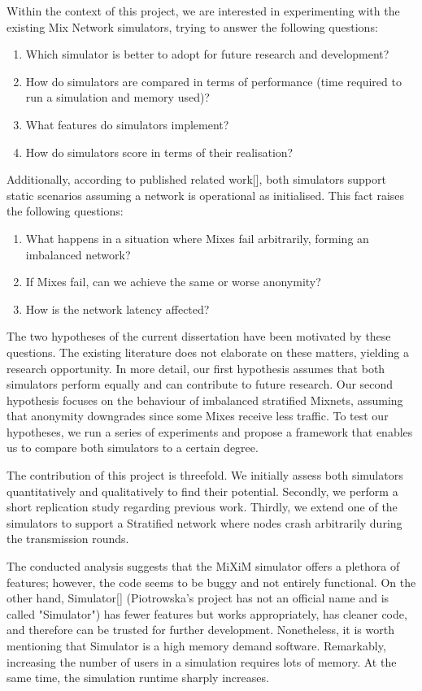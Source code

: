 \documentclass[logo,msc,cyber]{infthesis}   %
\begin{document}
Within the context of this project, we are interested in experimenting with the
existing Mix Network simulators, trying to answer the following questions:  

\begin{enumerate}
   \item Which simulator is better to adopt for future research and development?
   \item How do simulators are compared in terms of performance (time required to run a simulation and memory used)?
   \item What features do simulators implement?
   \item How do simulators score in terms of their realisation?
\end{enumerate}
 
Additionally, according to published related work[], both simulators support
static scenarios assuming a network is operational as initialised. This fact
raises the following questions:

\begin{enumerate}
   \item What happens in a situation where Mixes fail arbitrarily, forming an imbalanced network?
   \item If Mixes fail, can we achieve the same or worse anonymity?
   \item How is the network latency affected?
\end{enumerate}

The two hypotheses of the current dissertation have been motivated by these
questions. The existing literature does not elaborate on these matters, yielding
a research opportunity. In more detail, our first hypothesis assumes that both
simulators perform equally and can contribute to future research. Our second
hypothesis focuses on the behaviour of imbalanced stratified Mixnets, assuming
that anonymity downgrades since some Mixes receive less traffic. To test our
hypotheses, we run a series of experiments and propose a framework that enables
us to compare both simulators to a certain degree.

The contribution of this project is threefold. We initially assess both
simulators quantitatively and qualitatively to find their potential. Secondly,
we perform a short replication study regarding previous work. Thirdly, we extend
one of the simulators to support a Stratified network where nodes crash
arbitrarily during the transmission rounds.

The conducted analysis suggests that the MiXiM simulator offers a plethora of
features; however, the code seems to be buggy and not entirely functional. On
the other hand, Simulator[] (Piotrowska's project has not an official name and is
called "Simulator") has fewer features but works appropriately, has cleaner
code, and therefore can be trusted for further development. Nonetheless, it is
worth mentioning that Simulator is a high memory demand software. Remarkably,
increasing the number of users in a simulation requires lots of memory. At the
same time, the simulation runtime sharply increases.
\end{document}
